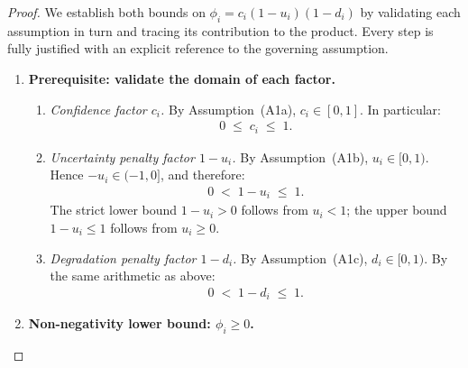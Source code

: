 \documentclass[12pt,openany]{book}
\numberwithin{equation}{chapter}
\theoremstyle{plain}
\theoremstyle{definition}
\theoremstyle{remark}
\numberwithin{equation}{chapter}
\theoremstyle{plain}
\begin{document}
\begin{proof}
We establish both bounds on $\phi_i = c_i(1-u_i)(1-d_i)$
by validating each assumption in turn and tracing its
contribution to the product.  Every step is fully justified
with an explicit reference to the governing assumption.

\begin{enumerate}

  \item[\textup{(1)}] \textbf{Prerequisite: validate the
        domain of each factor.}

        \begin{enumerate}

          \item[\textup{(1a)}] \textit{Confidence factor
                $c_i$.}
                By Assumption~\textup{(A1a)},
                $c_i \in [0,1]$.
                In particular:
                \begin{align}
                  0 \;\leq\; c_i \;\leq\; 1.
                  \label{eq:ci-domain}
                \end{align}

          \item[\textup{(1b)}] \textit{Uncertainty penalty
                factor $1 - u_i$.}
                By Assumption~\textup{(A1b)},
                $u_i \in [0,1)$.
                Hence $-u_i \in (-1,0]$, and therefore:
                \begin{align}
                  0 \;<\; 1 - u_i \;\leq\; 1.
                  \label{eq:ui-domain}
                \end{align}
                The strict lower bound $1 - u_i > 0$ follows
                from $u_i < 1$; the upper bound $1 - u_i \leq 1$
                follows from $u_i \geq 0$.

          \item[\textup{(1c)}] \textit{Degradation penalty
                factor $1 - d_i$.}
                By Assumption~\textup{(A1c)},
                $d_i \in [0,1)$.
                By the same arithmetic as above:
                \begin{align}
                  0 \;<\; 1 - d_i \;\leq\; 1.
                  \label{eq:di-domain}
                \end{align}

        \end{enumerate}

  \item[\textup{(2)}] \textbf{Non-negativity lower bound:
        $\phi_i \geq 0$.}


\end{enumerate}
\end{proof}
\end{document}
